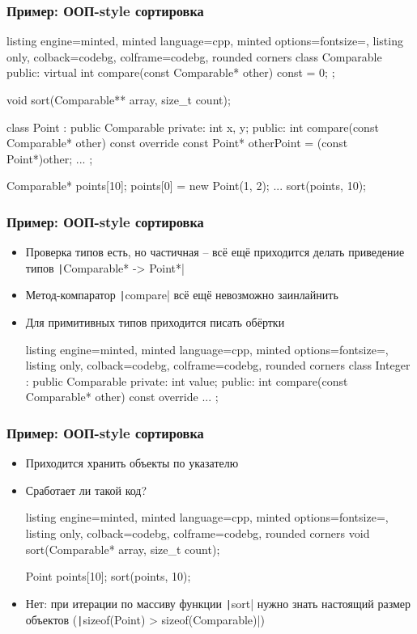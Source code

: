 \documentclass[10pt]{beamer}
\begin{document}
\begin{frame}[fragile]
\frametitle{Пример: ООП-style сортировка}
\begin{itemize}
\begin{tcblisting}{listing engine=minted, minted language=cpp, minted options={fontsize=\scriptsize}, listing only, colback=codebg, colframe=codebg, rounded corners}
class Comparable {
public:
  virtual int compare(const Comparable* other) const = 0;
};

void sort(Comparable** array, size_t count);

class Point : public Comparable {
private:
  int x, y;
public:
  int compare(const Comparable* other) const override {
    const Point* otherPoint = (const Point*)other;
    ...
  }
};

Comparable* points[10];
points[0] = new Point(1, 2);
...
sort(points, 10);
\end{tcblisting}
\end{itemize}
\end{frame}

\begin{frame}[fragile]
\frametitle{Пример: ООП-style сортировка}
\begin{itemize}
\item Проверка типов есть, но частичная -- всё ещё приходится делать приведение типов \texttt|Comparable* -> Point*|
\pause
\item Метод-компаратор \texttt|compare| всё ещё невозможно заинлайнить
\pause
\item Для примитивных типов приходится писать обёртки
\begin{tcblisting}{listing engine=minted, minted language=cpp, minted options={fontsize=\scriptsize}, listing only, colback=codebg, colframe=codebg, rounded corners}
class Integer : public Comparable {
private:
  int value;
public:
  int compare(const Comparable* other) const override {
    ...
  }
};
\end{tcblisting}
\end{itemize}
\end{frame}

\begin{frame}[fragile]
\frametitle{Пример: ООП-style сортировка}
\begin{itemize}
\item Приходится хранить объекты по указателю
\pause
\item Сработает ли такой код?
\begin{tcblisting}{listing engine=minted, minted language=cpp, minted options={fontsize=\scriptsize}, listing only, colback=codebg, colframe=codebg, rounded corners}
void sort(Comparable* array, size_t count);

Point points[10];
sort(points, 10);
\end{tcblisting}
\pause
{}
\item Нет: при итерации по массиву функции \texttt|sort| нужно знать настоящий размер объектов (\texttt|sizeof(Point) > sizeof(Comparable)|)
\end{itemize}
\end{frame}
\end{document}
